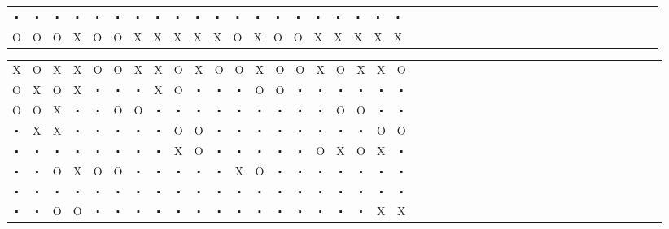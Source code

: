 \documentclass[fontscale=0.38]{baposter}
\begin{document}
\begin{poster}
{{\begin{center}
\begin{tabular}{cccccccccccccccccccccccccccccccccccccccccc}
    $\centerdot$&$\centerdot$&$\centerdot$&$\centerdot$&$\centerdot$&$\centerdot$&$\centerdot$&$\centerdot$&$\centerdot$&$\centerdot$&$\centerdot$&$\centerdot$&$\centerdot$&$\centerdot$&$\centerdot$&$\centerdot$&$\centerdot$&$\centerdot$&$\centerdot$&$\centerdot$\\
    O&O&O&X&O&O&X&X&X&X&X&O&X&O&O&X&X&X&X&X\\
    \end{tabular} \end{center} 

  }\parbox[b]{.3\textwidth}{
     
    \begin{center} \tiny \setlength{\tabcolsep}{0pt} \begin{tabular}{cccccccccccccccccccccccccccccccccccccccccc}
    X&O&X&X&O&O&X&X&O&X&O&O&X&O&O&X&O&X&X&O\\
    O&X&O&X&$\centerdot$&$\centerdot$&$\centerdot$&X&O&$\centerdot$&$\centerdot$&$\centerdot$&O&O&$\centerdot$&$\centerdot$&$\centerdot$&$\centerdot$&$\centerdot$&$\centerdot$\\
    O&O&X&$\centerdot$&$\centerdot$&O&O&$\centerdot$&$\centerdot$&$\centerdot$&$\centerdot$&$\centerdot$&$\centerdot$&$\centerdot$&$\centerdot$&$\centerdot$&O&O&$\centerdot$&$\centerdot$\\
    $\centerdot$&X&X&$\centerdot$&$\centerdot$&$\centerdot$&$\centerdot$&$\centerdot$&O&O&$\centerdot$&$\centerdot$&$\centerdot$&$\centerdot$&$\centerdot$&$\centerdot$&$\centerdot$&$\centerdot$&O&O\\
    $\centerdot$&$\centerdot$&$\centerdot$&$\centerdot$&$\centerdot$&$\centerdot$&$\centerdot$&$\centerdot$&X&O&$\centerdot$&$\centerdot$&$\centerdot$&$\centerdot$&$\centerdot$&O&X&O&X&$\centerdot$\\
    $\centerdot$&$\centerdot$&O&X&O&O&$\centerdot$&$\centerdot$&$\centerdot$&$\centerdot$&$\centerdot$&X&O&$\centerdot$&$\centerdot$&$\centerdot$&$\centerdot$&$\centerdot$&$\centerdot$&$\centerdot$\\
    $\centerdot$&$\centerdot$&$\centerdot$&$\centerdot$&$\centerdot$&$\centerdot$&$\centerdot$&$\centerdot$&$\centerdot$&$\centerdot$&$\centerdot$&$\centerdot$&$\centerdot$&$\centerdot$&$\centerdot$&$\centerdot$&$\centerdot$&$\centerdot$&$\centerdot$&$\centerdot$\\
    $\centerdot$&$\centerdot$&O&O&$\centerdot$&$\centerdot$&$\centerdot$&$\centerdot$&$\centerdot$&$\centerdot$&$\centerdot$&$\centerdot$&$\centerdot$&$\centerdot$&$\centerdot$&$\centerdot$&$\centerdot$&$\centerdot$&X&X\\

\end{tabular}
\end{center}}}
\end{poster}
\end{document}
